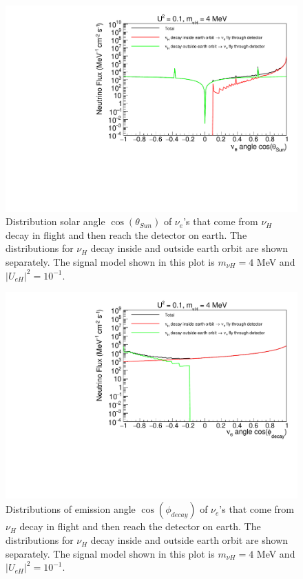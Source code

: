 \documentclass[%
 reprint,
 amsmath,amssymb,
 aps,
 prd,
floatfix,
twocolumn,
]{revtex4-1}
\begin{document}
\begin{figure}[!htbp]
\includegraphics[width=0.99\columnwidth]{../plots/DecayInFlightNuLCosthetaSun_U0.1_M4.0_InsideOutside_linXlogY.pdf}
\caption{Distribution solar angle $\cos(\theta_{Sun})$ of $\nu_e$'s that come from $\nu_H$ decay in flight and then reach the detector on earth. The distributions for $\nu_H$ decay inside and outside earth orbit are shown separately. The signal model shown in this plot is $m_{\nu H} = 4$ MeV and $|U_{eH}|^2 = 10^{-1}$.}
\label{fig:DecayInFlightTheta_U0.1_M4} 
\end{figure}


\begin{figure}[!htbp]
\includegraphics[width=0.99\columnwidth]{../plots/DecayInFlightNuLCosphiSun_U0.1_M4.0_InsideOutside_linXlogY.pdf}
\caption{Distributions of emission angle $\cos(\phi_{decay})$ of $\nu_e$'s that come from $\nu_H$ decay in flight and then reach the detector on earth. The distributions for $\nu_H$ decay inside and outside earth orbit are shown separately. The signal model shown in this plot is $m_{\nu H} = 4$ MeV and $|U_{eH}|^2 = 10^{-1}$.}
\label{fig:DecayInFlightPhi_U0.1_M4} 
\end{figure}
\end{document}

